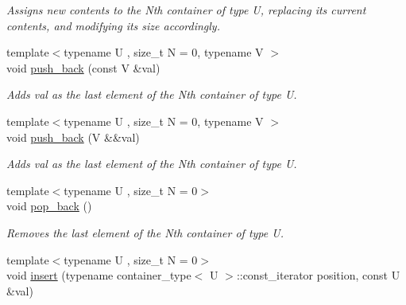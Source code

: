 \begin{DoxyCompactItemize}
\begin{DoxyCompactList}\small\item\em Assigns new contents to the Nth container of type U, replacing its current contents, and modifying its size accordingly. \end{DoxyCompactList}\item 
\hypertarget{classheterogeneous_1_1heterovector_3_01_t_00_01_types_8_8_8_4_ae0341fe7ed3e5cab6e124221e4b2af7d}{}{\footnotesize template$<$typename U , size\+\_\+t N = 0, typename V $>$ }\\void \hyperlink{classheterogeneous_1_1heterovector_3_01_t_00_01_types_8_8_8_4_ae0341fe7ed3e5cab6e124221e4b2af7d}{push\+\_\+back} (const V \&val)\label{classheterogeneous_1_1heterovector_3_01_t_00_01_types_8_8_8_4_ae0341fe7ed3e5cab6e124221e4b2af7d}

\begin{DoxyCompactList}\small\item\em Adds val as the last element of the Nth container of type U. \end{DoxyCompactList}\item 
\hypertarget{classheterogeneous_1_1heterovector_3_01_t_00_01_types_8_8_8_4_a15ea664e8f35ea0b4886d0f084712c28}{}{\footnotesize template$<$typename U , size\+\_\+t N = 0, typename V $>$ }\\void \hyperlink{classheterogeneous_1_1heterovector_3_01_t_00_01_types_8_8_8_4_a15ea664e8f35ea0b4886d0f084712c28}{push\+\_\+back} (V \&\&val)\label{classheterogeneous_1_1heterovector_3_01_t_00_01_types_8_8_8_4_a15ea664e8f35ea0b4886d0f084712c28}

\begin{DoxyCompactList}\small\item\em Adds val as the last element of the Nth container of type U. \end{DoxyCompactList}\item 
\hypertarget{classheterogeneous_1_1heterovector_3_01_t_00_01_types_8_8_8_4_ae2d7139ede11f3542f645d87a349fb31}{}{\footnotesize template$<$typename U , size\+\_\+t N = 0$>$ }\\void \hyperlink{classheterogeneous_1_1heterovector_3_01_t_00_01_types_8_8_8_4_ae2d7139ede11f3542f645d87a349fb31}{pop\+\_\+back} ()\label{classheterogeneous_1_1heterovector_3_01_t_00_01_types_8_8_8_4_ae2d7139ede11f3542f645d87a349fb31}

\begin{DoxyCompactList}\small\item\em Removes the last element of the Nth container of type U. \end{DoxyCompactList}\item 
\hypertarget{classheterogeneous_1_1heterovector_3_01_t_00_01_types_8_8_8_4_a50b101d960180871df1d25efa2f4d51a}{}{\footnotesize template$<$typename U , size\+\_\+t N = 0$>$ }\\void \hyperlink{classheterogeneous_1_1heterovector_3_01_t_00_01_types_8_8_8_4_a50b101d960180871df1d25efa2f4d51a}{insert} (typename container\+\_\+type$<$ U $>$\+::const\+\_\+iterator position, const U \&val)\label{classheterogeneous_1_1heterovector_3_01_t_00_01_types_8_8_8_4_a50b101d960180871df1d25efa2f4d51a}


\end{DoxyCompactItemize}

